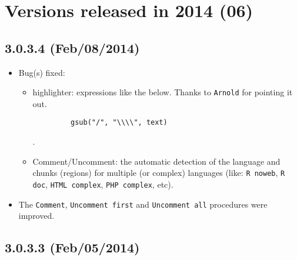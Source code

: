 
\hypertarget{2014}{}
\section{Versions released in 2014 (06)}

\subsection*{3.0.3.4 (Feb/08/2014)}
\begin{itemize}
  \item Bug(s) fixed:
    \begin{itemize}
      \item \RR{} highlighter: expressions like the below. Thanks to \texttt{Arnold} for pointing it out.
       \begin{verbatim}
         gsub("/", "\\\\", text)
       \end{verbatim}.
      \item Comment/Uncomment: the automatic detection of the language and chunks (regions) for multiple (or complex) languages
       (like: \texttt{R noweb}, \texttt{R doc}, \texttt{HTML complex}, \texttt{PHP complex}, etc).
    \end{itemize}
  \item The \texttt{Comment}, \texttt{Uncomment first} and \texttt{Uncomment all}
   procedures were improved.
\end{itemize}


\subsection*{3.0.3.3 (Feb/05/2014)}



